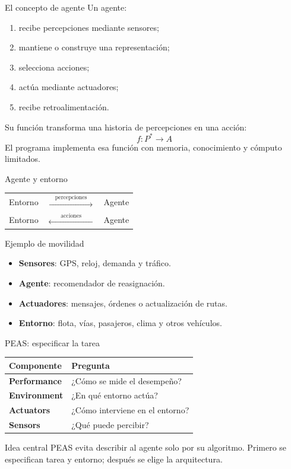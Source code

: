 \documentclass[aspectratio=169,11pt]{beamer}
\newcommand{\concepto}[1]{\textcolor{UAPTeal}{\textbf{#1}}}
\begin{document}
\begin{frame}{El concepto de agente}
  Un agente:
  \begin{enumerate}
    \item recibe percepciones mediante sensores;
    \item mantiene o construye una representación;
    \item selecciona acciones;
    \item actúa mediante actuadores;
    \item recibe retroalimentación.
  \end{enumerate}
  Su función transforma una historia de percepciones en una acción:
  \[
    f: P^* \longrightarrow A
  \]
  El programa implementa esa función con memoria, conocimiento y cómputo limitados.
\end{frame}

\begin{frame}{Agente y entorno}
  \begin{center}
    \begin{tabular}{c c c}
      Entorno & $\xrightarrow{\quad\text{percepciones}\quad}$ & Agente \\
      Entorno & $\xleftarrow{\qquad\text{acciones}\qquad}$ & Agente
    \end{tabular}
  \end{center}
  \begin{block}{Ejemplo de movilidad}
    \begin{itemize}
      \item \concepto{Sensores}: GPS, reloj, demanda y tráfico.
      \item \concepto{Agente}: recomendador de reasignación.
      \item \concepto{Actuadores}: mensajes, órdenes o actualización de rutas.
      \item \concepto{Entorno}: flota, vías, pasajeros, clima y otros vehículos.
    \end{itemize}
  \end{block}
\end{frame}

\begin{frame}{PEAS: especificar la tarea}
  \small
  \begin{tabularx}{\textwidth}{>{\bfseries}p{} X}
    \toprule
    Componente & Pregunta \\
    \midrule
    Performance & ¿Cómo se mide el desempeño? \\
    Environment & ¿En qué entorno actúa? \\
    Actuators & ¿Cómo interviene en el entorno? \\
    Sensors & ¿Qué puede percibir? \\
    \bottomrule
  \end{tabularx}
  \vfill
  \begin{block}{Idea central}
    PEAS evita describir al agente solo por su algoritmo. Primero se especifican tarea y entorno; después se elige la arquitectura.
  \end{block}
\end{frame}
\end{document}
